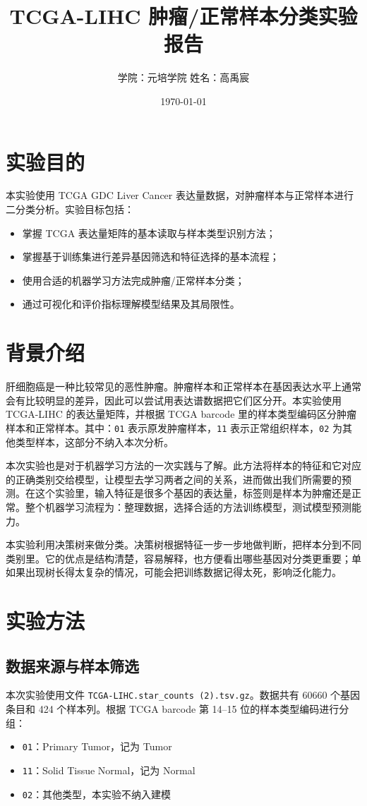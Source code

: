 \documentclass[12pt,fontset=fandol]{ctexart}
\title{TCGA-LIHC 肿瘤/正常样本分类实验报告}
\author{学院：元培学院 \quad 姓名：高禹宸}
\date{\today}
\begin{document}
\maketitle

\section{实验目的}
本实验使用 TCGA GDC Liver Cancer 表达量数据，对肿瘤样本与正常样本进行二分类分析。实验目标包括：
\begin{itemize}
  \item 掌握 TCGA 表达量矩阵的基本读取与样本类型识别方法；
  \item 掌握基于训练集进行差异基因筛选和特征选择的基本流程；
  \item 使用合适的机器学习方法完成肿瘤/正常样本分类；
  \item 通过可视化和评价指标理解模型结果及其局限性。
\end{itemize}

\section{背景介绍}
肝细胞癌是一种比较常见的恶性肿瘤。肿瘤样本和正常样本在基因表达水平上通常会有比较明显的差异，因此可以尝试用表达谱数据把它们区分开。本实验使用 TCGA-LIHC 的表达量矩阵，并根据 TCGA barcode 里的样本类型编码区分肿瘤样本和正常样本。其中：\texttt{01} 表示原发肿瘤样本，\texttt{11} 表示正常组织样本，\texttt{02} 为其他类型样本，这部分不纳入本次分析。

本次实验也是对于机器学习方法的一次实践与了解。此方法将样本的特征和它对应的正确类别交给模型，让模型去学习两者之间的关系，进而做出我们所需要的预测。在这个实验里，输入特征是很多个基因的表达量，标签则是样本为肿瘤还是正常。整个机器学习流程为：整理数据，选择合适的方法训练模型，测试模型预测能力。

本实验利用决策树来做分类。决策树根据特征一步一步地做判断，把样本分到不同类别里。它的优点是结构清楚，容易解释，也方便看出哪些基因对分类更重要；单如果出现树长得太复杂的情况，可能会把训练数据记得太死，影响泛化能力。

\section{实验方法}
\subsection{数据来源与样本筛选}
本次实验使用文件 \texttt{TCGA-LIHC.star\_counts (2).tsv.gz}。数据共有 60660 个基因条目和 424 个样本列。根据 TCGA barcode 第 14--15 位的样本类型编码进行分组：
\begin{itemize}
  \item \texttt{01}：Primary Tumor，记为 Tumor
  \item \texttt{11}：Solid Tissue Normal，记为 Normal
  \item \texttt{02}：其他类型，本实验不纳入建模
\end{itemize}
\end{document}
